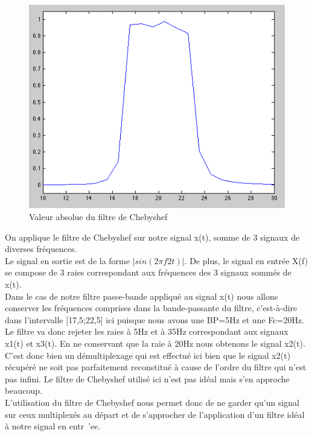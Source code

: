 \documentclass[a4paper, oneside]{report}
\begin{document}
 \begin{figure}[h]
 \centering
 \includegraphics[scale=0.8]{images/cheby.png}
 \caption{Valeur absolue du filtre de Chebyshef}
 \end{figure}
 
 
On applique le filtre de Chebyshef sur notre signal x(t), somme de 3 signaux de diverses fr\'equences.\\
Le signal en sortie est de la forme $|sin(2\pi f2t)|$.
De plus, le signal en entr\'ee X(f) se compose de 3 raies correspondant aux fr\'equences des 3 signaux somm\'es de x(t).\\

Dans le cas de notre filtre passe-bande appliqu\'e au signal x(t) nous allons conserver les fr\'equences comprises dans la bande-passante du filtre, c'est-\`a-dire dans l'intervalle [17,5;22,5] ici puisque nous avons une BP=5Hz et une Fc=20Hz.\\
Le filtre va donc rejeter les raies \`a 5Hz et \`a 35Hz correspondant aux signaux x1(t) et x3(t). En ne conservant que la raie \`a 20Hz nous obtenons le signal x2(t).\\

C'est donc bien un d\'emultiplexage qui est effectu\'e ici bien que le signal x2(t) r\'ecup\'er\'e ne soit pas parfaitement reconstitu\'e \`a cause de l'ordre du filtre qui n'est pas infini. Le filtre de Chebyshef utilis\'e ici n'est pas id\'eal mais s'en approche beaucoup.\\

L'utilisation du filtre de Chebyshef nous permet donc de ne garder qu'un signal sur ceux multiplex\'es au d\'epart et de s'approcher de l'application d'un filtre id\'eal \`a notre signal en entr\ 'ee.\\
\end{document}
